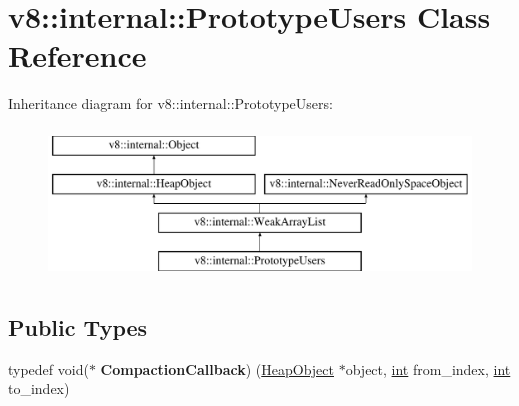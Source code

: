 \hypertarget{classv8_1_1internal_1_1PrototypeUsers}{}\section{v8\+:\+:internal\+:\+:Prototype\+Users Class Reference}
\label{classv8_1_1internal_1_1PrototypeUsers}
Inheritance diagram for v8\+:\+:internal\+:\+:Prototype\+Users\+:\begin{figure}[H]
\begin{center}
\leavevmode
\includegraphics[height=4.000000cm]{classv8_1_1internal_1_1PrototypeUsers}
\end{center}
\end{figure}
\subsection*{Public Types}
\begin{DoxyCompactItemize}
\item 
\mbox{\label{classv8_1_1internal_1_1PrototypeUsers_af840963f223ac6d0e999070f75f3b208}} 
typedef void($\ast$ {\bfseries Compaction\+Callback}) (\mbox{\hyperlink{classv8_1_1internal_1_1HeapObject}{Heap\+Object}} $\ast$object, \mbox{\hyperlink{classint}{int}} from\+\_\+index, \mbox{\hyperlink{classint}{int}} to\+\_\+index)
\end{DoxyCompactItemize}
